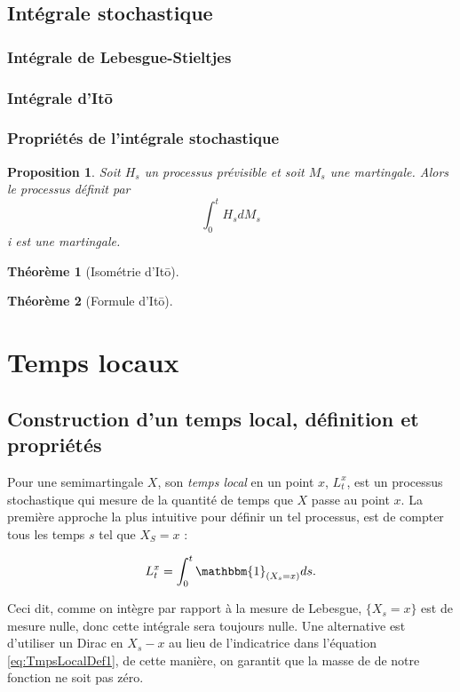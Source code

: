 \documentclass[openany]{book}
\newcommand{\1}{\mathbbm{1}}
\theoremstyle{thmfont}
\newtheorem{theorem}{Théorème}[chapter]
\theoremstyle{deffont}
\theoremstyle{thmfont}
\newtheorem{prop}[prop]{Proposition}
\theoremstyle{deffont}
\begin{document}
\section{Intégrale stochastique}  
\subsection{Intégrale de Lebesgue-Stieltjes}
\subsection{Intégrale d'Itō}
\subsection{Propriétés de l'intégrale stochastique}
{\color{red}
\begin{prop}
  Soit $H_s$ un processus prévisible et soit $M_s$ une martingale. Alors le processus définit par 
  $$\int_0^t H_s dM_s$$
i
  est une martingale.
\end{prop}
}

{\color{red}
\begin{theorem}[Isométrie d'Itō]
      \label{thm:IsometrieIto}
\end{theorem}

\begin{theorem}[Formule d'Itō]
  \label{thm:FormuleIto}
\end{theorem}
}

\chapter{Temps locaux}
\section{Construction d'un temps local, définition et propriétés}\label{sec:ConstrTempsLoc}

Pour une semimartingale $X$, son \textit{temps local} en un point $x$, $L_t^x$, est un processus stochastique qui mesure de la quantité de temps que $X$ passe au point $x$. La première approche la plus intuitive pour définir un tel processus, est de compter tous les temps $s$ tel que $X_S = x$ :

\begin{equation}
  \label{eq:TmpsLocalDef1}
   L^x_t= \int_0^t\1_{(X_s=x)}ds.
  \end{equation}

  Ceci dit, comme on intègre par rapport à la mesure de Lebesgue, $\{X_s = x\}$ est de mesure nulle, donc cette intégrale sera toujours nulle. Une alternative est d'utiliser un Dirac en $X_s - x$ au lieu de l'indicatrice dans l'équation \eqref{eq:TmpsLocalDef1}, de cette manière, on garantit que la masse de de notre fonction ne soit pas zéro.
\end{document}
